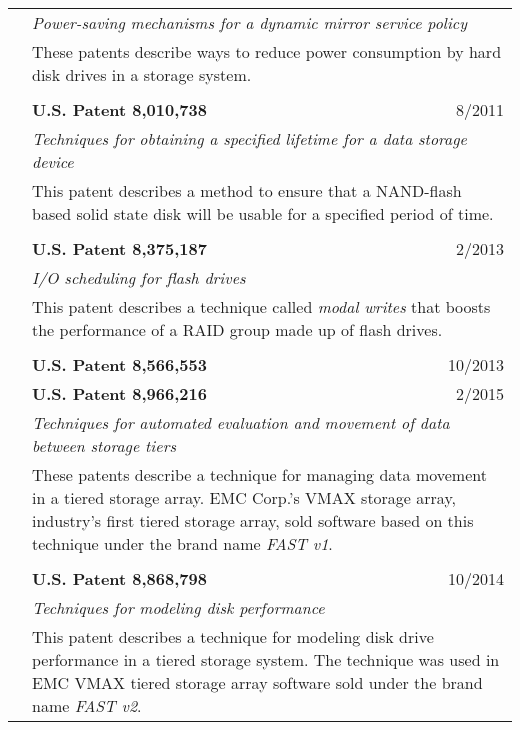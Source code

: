 \documentclass[10pt]{article}
\begin{document}
\begin{longtable}{p{ 90pt}p{299pt}r}
                    & \multicolumn{2}{p{4.5in}}{\em Power-saving mechanisms for a dynamic mirror service policy} \\
                    & \multicolumn{2}{p{4.5in}}{These patents describe ways to reduce power consumption by hard disk drives in a storage system.} \\
\\
                    & {\bf U.S. Patent 8,010,738} & 8/2011 \\
                    & \multicolumn{2}{p{4.5in}}{\em Techniques for obtaining a specified lifetime for a data storage device} \\
                    & \multicolumn{2}{p{4.5in}}{This patent describes a method to ensure that a NAND-flash based solid state disk will be
						usable for a specified period of time.} \\
\\
                    & {\bf U.S. Patent 8,375,187} & 2/2013 \\
                    & \multicolumn{2}{p{4.5in}}{\em I/O scheduling for flash drives} \\
                    & \multicolumn{2}{p{4.5in}}{This patent describes a technique called {\em modal writes} that boosts the performance of
		    a RAID group made up of flash drives.} \\
\\
                    & {\bf U.S. Patent 8,566,553} & 10/2013 \\
                    & {\bf U.S. Patent 8,966,216} & 2/2015 \\
                    & \multicolumn{2}{p{4.5in}}{\em Techniques for automated evaluation and movement of data between storage tiers} \\
                    & \multicolumn{2}{p{4.5in}}{These patents describe a technique for managing data movement in a tiered storage array.
		    EMC Corp.'s VMAX storage array, industry's first tiered storage array, sold software based on this technique under
		    the brand name {\em FAST v1}.} \\
\\
                    & {\bf U.S. Patent 8,868,798} & 10/2014 \\
                    & \multicolumn{2}{p{4.5in}}{\em Techniques for modeling disk performance} \\
                    & \multicolumn{2}{p{4.5in}}{This patent describes a technique for modeling disk drive performance in a tiered storage
		    system. The technique was used in EMC VMAX tiered storage array software sold under the brand name {\em FAST v2}.} \\

\end{longtable}
\end{document}
